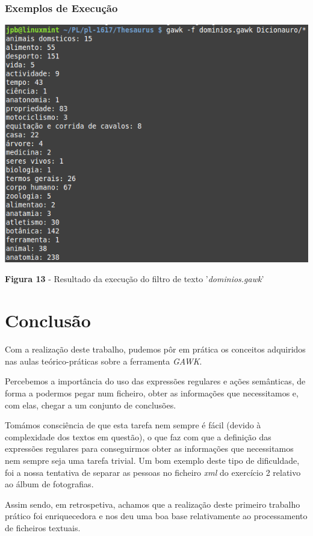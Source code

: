 \documentclass{article}
\begin{document}
\newpage
\subsubsection{Exemplos de Execução}


\begin{center}
    \includegraphics[scale=0.7]{imagens/dominios}
    \newline\caption{\textbf{Figura 13} - Resultado da execução do filtro de texto '\emph{dominios.gawk}'}
\end{center}

\newpage
\section{Conclusão}

Com a realização deste trabalho, pudemos pôr em prática os conceitos adquiridos nas aulas teórico-práticas sobre a ferramenta \emph{GAWK}.

Percebemos a importância do uso das expressões regulares e ações semânticas, de forma a podermos pegar num ficheiro, obter as informações que necessitamos e, com elas, chegar a um conjunto de conclusões.

Tomámos consciência de que esta tarefa nem sempre é fácil (devido à complexidade dos textos em questão), o que faz com que a definição das expressões regulares para conseguirmos obter as informações que necessitamos nem sempre seja uma tarefa trivial. Um bom exemplo deste tipo de dificuldade, foi a nossa tentativa de separar as pessoas no ficheiro \emph{xml} do exercício 2 relativo ao álbum de fotografias.

Assim sendo, em retrospetiva, achamos que a realização deste primeiro trabalho prático foi enriquecedora e nos deu uma boa base relativamente ao processamento de ficheiros textuais.
\end{document}
